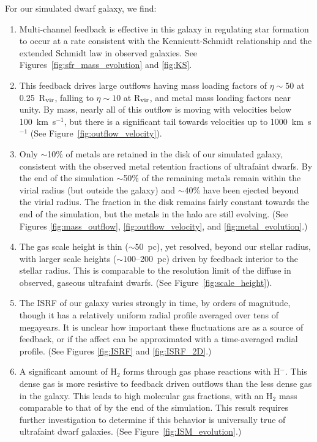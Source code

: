\documentclass[twocolumn]{aastex61}
\begin{document}
For our simulated dwarf galaxy, we find:
\begin{enumerate}
\item Multi-channel feedback is effective in this galaxy in regulating star formation to occur at a rate consistent with the Kennicutt-Schmidt relationship and the extended Schmidt law in observed galaxies. See Figures~\ref{fig:sfr_mass_evolution} and \ref{fig:KS}.

\item This feedback drives large outflows having mass loading factors of $\eta \sim 50$ at 0.25~R$_{\rm vir}$, falling to $\eta \sim 10$ at R$_{\rm vir}$,  and
metal mass loading factors near unity. By mass, nearly all of this outflow is moving with velocities below 100~km~s$^{-1}$, but there is a significant tail towards velocities up to 1000~km~s$^{-1}$ (See Figure~\ref{fig:outflow_velocity}). 

\item 
Only $\sim$10\% of metals are retained in the disk of our simulated galaxy, consistent with the observed metal retention fractions of ultrafaint dwarfs.  By the end of the simulation $\sim$50\% of the remaining metals remain within the virial radius (but outside the galaxy) and $\sim$40\% 
have been ejected beyond the virial radius. The fraction in the disk remains fairly constant towards the end of the simulation, but the metals in the halo are still evolving. (See Figures \ref{fig:mass_outflow}, \ref{fig:outflow_velocity}, and \ref{fig:metal_evolution}.)

\item 
The gas scale height is thin ($\sim 50$~pc), yet resolved, 
beyond our stellar radius, with larger scale heights ($\sim 100$--200~pc) driven by feedback interior to the stellar radius. This is comparable to the resolution limit of the diffuse  in observed, gaseous ultrafaint dwarfs. (See Figure~\ref{fig:scale_height}).

\item The ISRF of our galaxy varies strongly in time, by orders of magnitude, though it has a relatively uniform radial profile averaged over tens of megayears. It is unclear how important these fluctuations are as a source of feedback, or if the affect can be approximated with a time-averaged radial profile. (See Figures \ref{fig:ISRF} and \ref{fig:ISRF_2D}.)

\item 
     A significant amount of H$_2$ forms
through gas phase reactions with H$^-$. This dense gas is more resistive to feedback driven outflows than the less dense gas in the galaxy. This leads to high molecular gas fractions, with an H$_2$ mass comparable to that of  by the end of the simulation. This result requires further investigation to determine if this behavior is universally true of ultrafaint dwarf galaxies. (See Figure~\ref{fig:ISM_evolution}.)


\end{enumerate}
\end{document}
